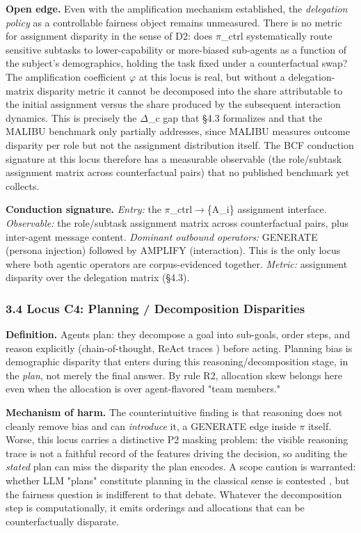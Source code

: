 \documentclass[10pt]{article}
\begin{document}
\textbf{Open edge.} Even with the amplification mechanism established, the \emph{delegation policy} as a controllable fairness object remains unmeasured. There is no metric for assignment disparity in the sense of D2: does $\pi$\_ctrl systematically route sensitive subtasks to lower-capability or more-biased sub-agents as a function of the subject's demographics, holding the task fixed under a counterfactual swap? The amplification coefficient $\varphi$ at this locus is real, but without a delegation-matrix disparity metric it cannot be decomposed into the share attributable to the initial assignment versus the share produced by the subsequent interaction dynamics. This is precisely the $\Delta$\_c gap that \S{}4.3 formalizes and that the MALIBU benchmark only partially addresses, since MALIBU measures outcome disparity per role but not the assignment distribution itself. The BCF conduction signature at this locus therefore has a measurable observable (the role/subtask assignment matrix across counterfactual pairs) that no published benchmark yet collects.

\textbf{Conduction signature.} \emph{Entry:} the $\pi$\_ctrl$\rightarrow$\{A\_i\} assignment interface. \emph{Observable:} the role/subtask assignment matrix across counterfactual pairs, plus inter-agent message content. \emph{Dominant outbound operators:} GENERATE (persona injection) followed by AMPLIFY (interaction). This is the only locus where both agentic operators are corpus-evidenced together. \emph{Metric:} assignment disparity over the delegation matrix (\S{}4.3).

\subsubsection*{3.4 Locus C4: Planning / Decomposition Disparities}

\textbf{Definition.} Agents plan: they decompose a goal into sub-goals, order steps, and reason explicitly (chain-of-thought, ReAct traces \cite{yao2023react}) before acting. Planning bias is demographic disparity that enters during this reasoning/decomposition stage, in the \emph{plan}, not merely the final answer. By rule R2, allocation skew belongs here even when the allocation is over agent-flavored "team members."

\textbf{Mechanism of harm.} The counterintuitive finding is that reasoning does not cleanly remove bias and can \emph{introduce} it, a GENERATE edge inside $\pi$ itself. Worse, this locus carries a distinctive P2 masking problem: the visible reasoning trace is not a faithful record of the features driving the decision, so auditing the \emph{stated} plan can miss the disparity the plan encodes. A scope caution is warranted: whether LLM "plans" constitute planning in the classical sense is contested \cite{kambhampati2024large}, but the fairness question is indifferent to that debate. Whatever the decomposition step is computationally, it emits orderings and allocations that can be counterfactually disparate.
\end{document}
